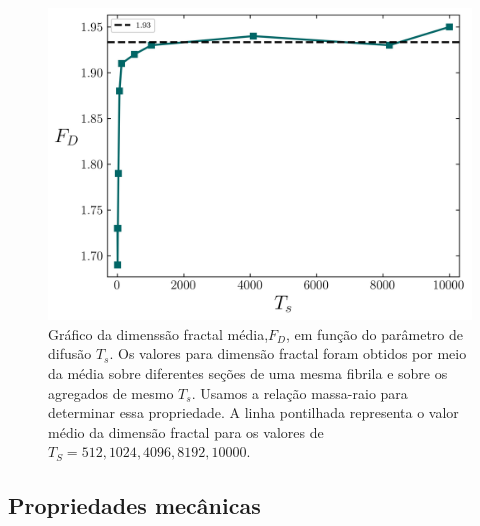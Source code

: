 \documentclass{report}
\begin{document}
        \begin{figure}[H]
            \centering
            \includegraphics[width=\textwidth]{figures/dim_frac.png}
    
            \caption{ Gráfico da dimenssão fractal média,\(F_{D}\), em função do parâmetro de difusão \(T_{s}\). Os valores para 
            dimensão fractal foram obtidos por meio da média sobre diferentes seções de uma mesma fibrila e sobre os agregados
            de mesmo  \(T_{s}\). Usamos a relação massa-raio para determinar essa propriedade. A linha pontilhada representa 
            o valor médio da dimensão fractal para os valores de \(T_{S}=512,1024,4096,8192,10000\).} 
    
            \label{R4}
        \end{figure}

        \subsection{Propriedades mecânicas}
\end{document}
